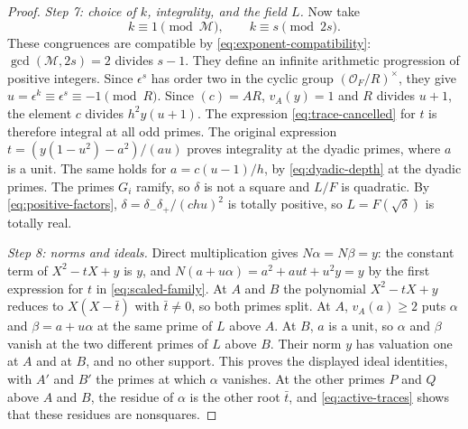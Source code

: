 \documentclass[11pt]{article}
\theoremstyle{plain}
\theoremstyle{definition}
\theoremstyle{remark}
\newcommand{\OO}{\mathcal O}
\begin{document}
\begin{proof}
\emph{Step 7: choice of $k$, integrality, and the field $L$.}  Now take
\[
 k\equiv1\pmod{\mathcal M},\qquad k\equiv s\pmod{2s}.
\]
These congruences are compatible by \eqref{eq:exponent-compatibility}:
$\gcd(\mathcal M,2s)=2$ divides $s-1$.  They define an infinite
arithmetic progression of positive integers.  Since $\epsilon^s$ has order
two in the cyclic group $(\OO_F/R)^\times$, they give $u=\epsilon^k\equiv
\epsilon^s\equiv-1\pmod R$.  Since $(c)=AR$, $v_A(y)=1$ and $R$ divides
$u+1$, the element $c$ divides $h^2y(u+1)$.  The expression
\eqref{eq:trace-cancelled} for $t$ is therefore integral at all odd
primes.  The original expression $t=(y(1-u^2)-a^2)/(au)$ proves
integrality at the dyadic primes, where $a$ is a unit.  The same holds for
$a=c(u-1)/h$, by \eqref{eq:dyadic-depth} at the dyadic primes.  The
primes $G_i$ ramify, so $\delta$ is not a square and $L/F$ is quadratic.
By \eqref{eq:positive-factors}, $\delta=\delta_-\delta_+/(chu)^2$ is
totally positive, so $L=F(\sqrt\delta)$ is totally real.

\emph{Step 8: norms and ideals.}  Direct multiplication gives
$N\alpha=N\beta=y$: the constant term of $X^2-tX+y$ is $y$, and
$N(a+u\alpha)=a^2+aut+u^2y=y$ by the first expression for $t$ in
\eqref{eq:scaled-family}.  At $A$ and $B$ the polynomial $X^2-tX+y$
reduces to $X(X-\bar t)$ with $\bar t\ne0$, so both primes split.  At
$A$, $v_A(a)\ge2$ puts $\alpha$ and $\beta=a+u\alpha$ at the same prime
of $L$ above $A$.  At $B$, $a$ is a unit, so $\alpha$ and $\beta$ vanish
at the two different primes of $L$ above $B$.  Their norm $y$ has
valuation one at $A$ and at $B$, and no other support.  This proves the
displayed ideal identities, with $A'$ and $B'$ the primes at which
$\alpha$ vanishes.  At the other primes $P$ and $Q$ above $A$ and $B$,
the residue of $\alpha$ is the other root $\bar t$, and
\eqref{eq:active-traces} shows that these residues are nonsquares.


\end{proof}
\end{document}
